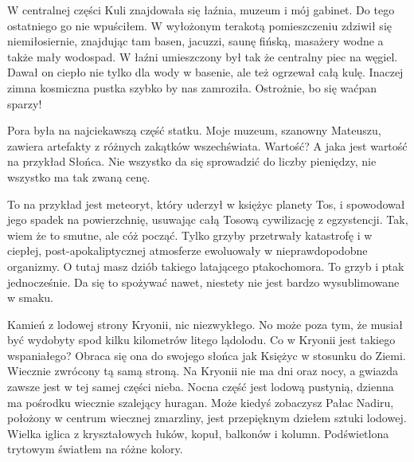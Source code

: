 W centralnej części Kuli znajdowała się łaźnia, muzeum i mój gabinet. Do tego ostatniego go nie wpuściłem.
W wyłożonym terakotą pomieszczeniu zdziwił się niemiłosiernie, znajdując tam basen, jacuzzi, saunę fińską, masażery wodne a także mały wodospad.
W łaźni umieszczony był tak że centralny piec na węgiel. Dawał on ciepło nie tylko dla wody w basenie, ale też ogrzewał całą kulę.
Inaczej zimna kosmiczna pustka szybko by nas zamroziła.
Ostrożnie, bo się waćpan sparzy!

Pora była na najciekawszą część statku.
Moje muzeum, szanowny Mateuszu, zawiera artefakty z różnych zakątków wszechświata. Wartość? A jaka jest wartość na przykład Słońca. 
Nie wszystko da się sprowadzić do liczby pieniędzy, nie wszystko ma tak zwaną cenę. 

To na przykład jest meteoryt, który uderzył w księżyc planety Tos, i spowodował jego spadek na powierzchnię, usuwając całą Tosową cywilizację z egzystencji.
Tak, wiem że to smutne, ale cóż począć. Tylko grzyby przetrwały katastrofę i w ciepłej, post-apokaliptycznej atmosferze ewoluowały w nieprawdopodobne organizmy.
O tutaj masz dziób takiego latającego ptakochomora. To grzyb i ptak jednocześnie. Da się to spożywać nawet, niestety nie jest bardzo wysublimowane w smaku.

Kamień z lodowej strony Kryonii, nic niezwykłego. No może poza tym, że musiał być wydobyty spod kilku kilometrów litego lądolodu.
Co w Kryonii jest takiego wspaniałego? Obraca się ona do swojego słońca jak Księżyc w stosunku do Ziemi. 
Wiecznie zwrócony tą samą stroną.
Na Kryonii nie ma dni oraz nocy, a gwiazda zawsze jest w tej samej części nieba.
Nocna część jest lodową pustynią, dzienna ma pośrodku wiecznie szalejący huragan.
Może kiedyś zobaczysz Pałac Nadiru, położony w centrum wiecznej zmarzliny, jest przepięknym dziełem sztuki lodowej.
Wielka iglica z kryształowych łuków, kopuł, balkonów i kolumn.
Podświetlona trytowym światłem na różne kolory.

